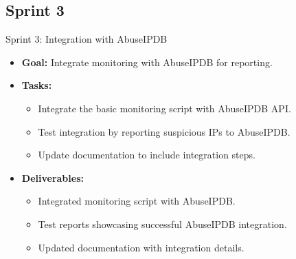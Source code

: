 \documentclass[11pt,a4paper]{article}
\begin{document}
    \subsection{Sprint 3}\label{subsec:sprint-3}
    \begin{frame}{Sprint 3: Integration with AbuseIPDB}
        \begin{itemize}
            \item \textbf{Goal:} Integrate monitoring with AbuseIPDB for reporting.
            \item \textbf{Tasks:}
            \begin{itemize}
                \item Integrate the basic monitoring script with AbuseIPDB API.
                \item Test integration by reporting suspicious IPs to AbuseIPDB.
                \item Update documentation to include integration steps.
            \end{itemize}
            \item \textbf{Deliverables:}
            \begin{itemize}
                \item Integrated monitoring script with AbuseIPDB.
                \item Test reports showcasing successful AbuseIPDB integration.
                \item Updated documentation with integration details.
            \end{itemize}
        \end{itemize}
    \end{frame}
\end{document}

